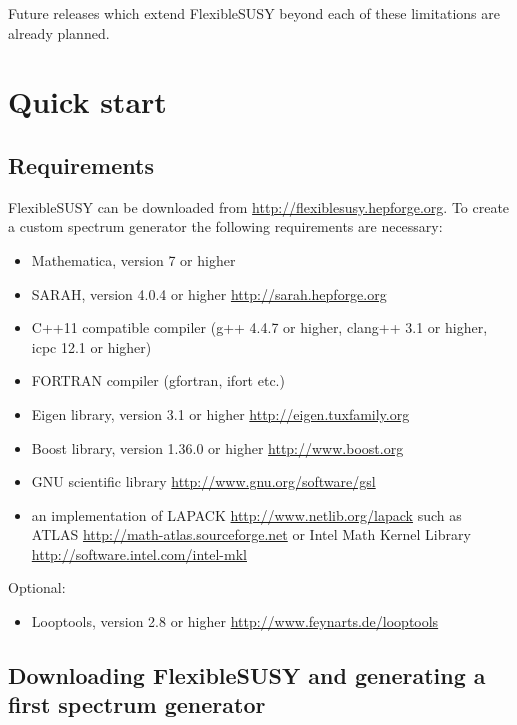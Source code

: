 \documentclass[final,3p,11pt,pdflatex]{elsarticle}
\makeatletter
\newcommand{\fs}{FlexibleSUSY\@\xspace}
\newcommand{\mathematica}{Mathematica\xspace}
\makeatother
\begin{document}
Future releases which extend \fs beyond each of these limitations are
already planned.  




\section{Quick start}
\label{sec:download}

\subsection{Requirements}

\fs can be downloaded from \url{http://flexiblesusy.hepforge.org}.  To
create a custom spectrum generator the following requirements are
necessary:
%
\begin{itemize}
\item \mathematica, version 7 or higher
\item SARAH, version 4.0.4 or higher \url{http://sarah.hepforge.org}
\item C++11 compatible compiler (g++ 4.4.7 or higher, clang++ 3.1 or
  higher, icpc 12.1 or higher)
\item FORTRAN compiler (gfortran, ifort etc.)
\item Eigen library, version 3.1 or higher
  \url{http://eigen.tuxfamily.org}
\item Boost library, version 1.36.0 or higher
  \url{http://www.boost.org}
\item GNU scientific library \url{http://www.gnu.org/software/gsl}
\item an implementation of LAPACK \url{http://www.netlib.org/lapack}
  such as ATLAS \url{http://math-atlas.sourceforge.net} or
  Intel Math Kernel Library \url{http://software.intel.com/intel-mkl}
\end{itemize}
%
Optional:
%
\begin{itemize}
\item Looptools, version 2.8 or higher
  \url{http://www.feynarts.de/looptools}
\end{itemize}

\subsection{Downloading \fs and generating a first spectrum generator}
\label{sec:quick-start-cmssm}
\end{document}
